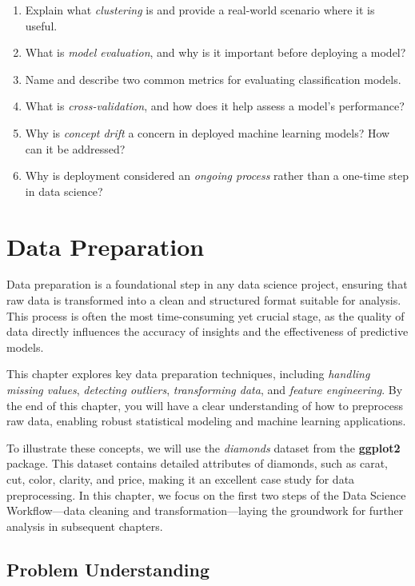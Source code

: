 \documentclass[
]{book}
\theoremstyle{definition}
\theoremstyle{definition}
\theoremstyle{definition}
\theoremstyle{definition}
\theoremstyle{remark}
\begin{document}
\begin{enumerate}
\item
  Explain what \emph{clustering} is and provide a real-world scenario where it is useful.
\item
  What is \emph{model evaluation}, and why is it important before deploying a model?\\
\item
  Name and describe two common metrics for evaluating classification models.\\
\item
  What is \emph{cross-validation}, and how does it help assess a model's performance?\\
\item
  Why is \emph{concept drift} a concern in deployed machine learning models? How can it be addressed?\\
\item
  Why is deployment considered an \emph{ongoing process} rather than a one-time step in data science?
\end{enumerate}

\chapter{Data Preparation}\label{chapter-data-prep}

Data preparation is a foundational step in any data science project, ensuring that raw data is transformed into a clean and structured format suitable for analysis. This process is often the most time-consuming yet crucial stage, as the quality of data directly influences the accuracy of insights and the effectiveness of predictive models.

This chapter explores key data preparation techniques, including \emph{handling missing values}, \emph{detecting outliers}, \emph{transforming data}, and \emph{feature engineering}. By the end of this chapter, you will have a clear understanding of how to preprocess raw data, enabling robust statistical modeling and machine learning applications.

To illustrate these concepts, we will use the \emph{diamonds} dataset from the \textbf{ggplot2} package. This dataset contains detailed attributes of diamonds, such as carat, cut, color, clarity, and price, making it an excellent case study for data preprocessing. In this chapter, we focus on the first two steps of the Data Science Workflow---data cleaning and transformation---laying the groundwork for further analysis in subsequent chapters.

\section{Problem Understanding}\label{problem-understanding}
\end{document}

